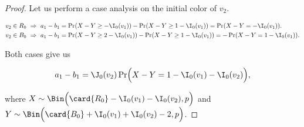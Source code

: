 \documentclass[11pt]{article}
\numberwithin{equation}{section}
\theoremstyle{definition}
\theoremstyle{plain}
\begin{document}
\begin{proof}
				\noindent Let us perform  %
				a %
				case analysis on 
				the initial color of $v_2$.  %
				\begin{linenomath}\begin{equation*}
						\begin{aligned}
							v_2 \in R_0
							& ~\Rightarrow~
							a_1 - b_1 = \Pr(X - Y \ge - \I_0(v_1)) - \Pr(X - Y \ge 1 - \I_0(v_1)) = \Pr(X - Y = - \I_0(v_1)).
							\\
							v_2 \in B_0
							& ~\Rightarrow~
							a_1 - b_1 = \Pr(X - Y \ge 2 - \I_0(v_1)) - \Pr(X - Y \ge 1 - \I_0(v_1)) = -\Pr(X - Y = 1 - \I_0(v_1)).
						\end{aligned}
				\end{equation*}\end{linenomath}
				\noindent Both cases give us
				\begin{linenomath}\begin{equation*}
						a_1 - b_1 = \J_0(v_2)\Pr\Bigl(X - Y = 1 - \I_0(v_1) - \I_0(v_2)\Bigr),
				\end{equation*}\end{linenomath}
				where $X\sim \Bin\Bigl(\card{R_0} - \I_0(v_1) - \I_0(v_2), p\Bigr)$
				and $Y\sim \Bin\Bigl(\card{B_0} + \I_0(v_1) + \I_0(v_2) - 2, p\Bigr)$.
				

\end{proof}
\end{document}
